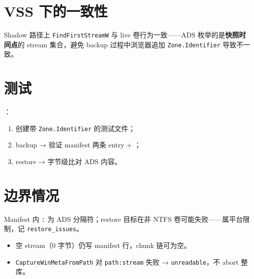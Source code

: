 \section{VSS 下的一致性}

Shadow 路径上 \texttt{FindFirstStreamW} 与 live 卷行为一致——ADS 枚举的是\textbf{快照时间点}的 stream 集合，避免 backup 过程中浏览器追加 \texttt{Zone.Identifier} 导致不一致。

\section{测试}

：

\begin{enumerate}[nosep]
  \item 创建带 \texttt{Zone.Identifier} 的测试文件；
  \item backup → 验证 manifest 两条 entry + ；
  \item restore → 字节级比对 ADS 内容。
\end{enumerate}

\section{边界情况}

\begin{warnbox}
Manifest 内 \texttt{:} 为 ADS 分隔符；restore 目标在非 NTFS 卷可能失败——属平台限制，记 \texttt{restore\_issues}。
\end{warnbox}

\begin{itemize}[nosep]
  \item 空 stream（0 字节）仍写 manifest 行，chunk 链可为空。
  \item \texttt{CaptureWinMetaFromPath} 对 \texttt{path:stream} 失败 → \texttt{unreadable}，不 abort 整库。
\end{itemize}
